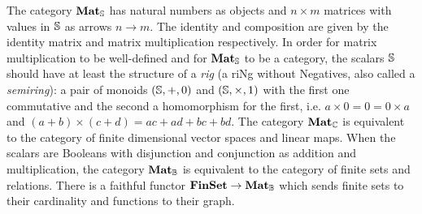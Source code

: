 \begin{example}
The category $\mathbf{Mat}_\S$ has natural numbers as objects and $n \times m$ matrices with values in $\S$ as arrows $n \to m$.
The identity and composition are given by the identity matrix and matrix multiplication respectively.
In order for matrix multiplication to be well-defined and for $\mathbf{Mat}_\S$ to be a category, the scalars $\S$ should have at least the structure of a \emph{rig} (a riNg without Negatives, also called a \emph{semiring}): a pair of monoids $(\S, +, 0)$ and $(\S, \times, 1)$ with the first one commutative and the second a homomorphism for the first, i.e. $a \times 0 = 0 = 0 \times a$ and $(a + b) \times (c + d) = a c + a d + b c + b d$.
The category $\mathbf{Mat}_\C$ is equivalent to the category of finite dimensional vector spaces and linear maps.
When the scalars are Booleans with disjunction and conjunction as addition and multiplication, the category $\mathbf{Mat}_\B$ is equivalent to the category of finite sets and relations.
There is a faithful functor $\mathbf{FinSet} \to \mathbf{Mat}_\B$ which sends finite sets to their cardinality and functions to their graph.
\end{example}

